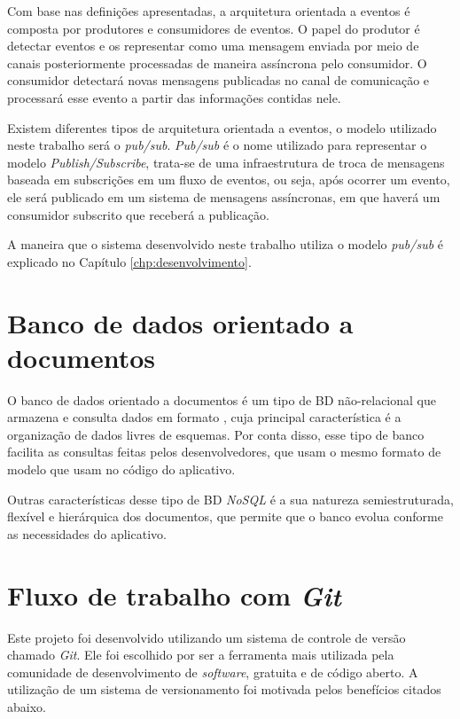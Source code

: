 Com base nas definições apresentadas, a arquitetura orientada a eventos é composta por produtores e consumidores de eventos. O papel do produtor é detectar eventos e os representar como uma mensagem enviada por meio de canais posteriormente processadas de maneira assíncrona pelo consumidor. O consumidor detectará novas mensagens publicadas no canal de comunicação e processará esse evento a partir das informações contidas nele. 

Existem diferentes tipos de arquitetura orientada a eventos, o modelo utilizado neste trabalho será o \textit{pub/sub}. \textit{Pub/sub} é o nome utilizado para representar o modelo \textit{Publish/Subscribe}, trata-se de uma infraestrutura de troca de mensagens baseada em subscrições em um fluxo de eventos, ou seja, após ocorrer um evento, ele será publicado em um sistema de mensagens assíncronas, em que haverá um consumidor subscrito que receberá a publicação.

A maneira que o sistema desenvolvido neste trabalho utiliza o modelo \textit{pub/sub} é explicado no Capítulo \ref{chp:desenvolvimento}.

\section{Banco de dados orientado a documentos}\label{sec:bd}
O banco de dados orientado a documentos é um tipo de BD não-relacional que armazena e consulta dados em formato , cuja principal característica é a organização de dados livres de esquemas. Por conta disso, esse tipo de banco facilita as consultas feitas pelos desenvolvedores, que usam o mesmo formato de modelo que usam no código do aplicativo.

Outras características desse tipo de BD \textit{NoSQL} é a sua natureza semiestruturada, flexível e hierárquica dos documentos, que permite que o banco evolua conforme as necessidades do aplicativo.

\section{Fluxo de trabalho com \textit{Git}}\label{sec:Git}
Este projeto foi desenvolvido utilizando um sistema de controle de versão chamado \textit{Git}. Ele foi escolhido por ser a ferramenta mais utilizada pela comunidade de desenvolvimento de \textit{software}, gratuita e de código aberto. A utilização de um sistema de versionamento foi motivada pelos benefícios citados abaixo.

